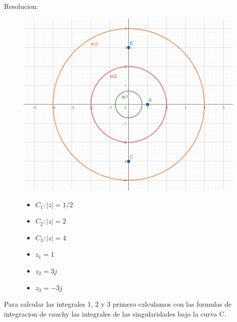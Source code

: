 \documentclass[12pt]{report}
\begin{document}
Resolucion:
\begin{figure}[h]
    \centering
    \begin{minipage}{0.65\textwidth}
        \centering
        \includegraphics[width=\textwidth]{./Imagenes/foto1Ej5.jpeg}
    \end{minipage}\hfill
    \begin{minipage}{0.35\textwidth}
        \centering
        \begin{itemize}
            \item $C_1:|z|=1/2$
            \item $C_2:|z|=2$
            \item $C_3:|z|=4$
            \item $z_1=1$
            \item $z_2=3j$
            \item $z_3=-3j$
        \end{itemize}
    \end{minipage}
\end{figure}

\vspace{1cm}
       
Para calcular las integrales 1, 2 y 3 primero calculamos con las formulas de integracion de cauchy las integrales de las singularidades bajo la curva C. \\
\end{document}

